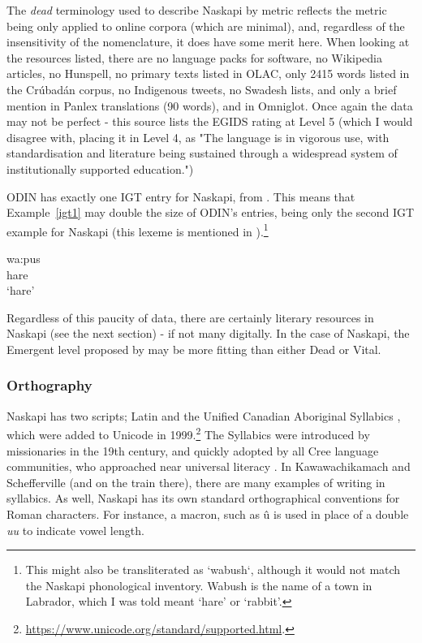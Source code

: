 The {\it dead} terminology used to describe Naskapi by  metric reflects the metric being only applied to online corpora (which are minimal), and, regardless of the insensitivity of the nomenclature, it does have some merit here. When looking at the resources listed, there are no language packs for software, no Wikipedia articles, no Hunspell, no primary texts listed in OLAC, only 2415 words listed in the Cr\'ubad\'an corpus, no Indigenous tweets, no Swadesh lists, and only a brief mention in Panlex translations (90 words), and in Omniglot. Once again the data may not be perfect - this source lists the EGIDS rating at Level 5 (which I would disagree with, placing it in Level 4, as "The language is in vigorous use, with standardisation and literature being sustained through a widespread system of institutionally supported education.")

ODIN has exactly one IGT entry for Naskapi, from \citet{richards2004syntax}. This means that Example~\ref{igt1} may double the size of ODIN's entries, being only the second IGT example for Naskapi (this lexeme is mentioned in \citet{macKenzie1980towards}).\footnote{This might also be transliterated as `wabush`, although it would not match the Naskapi phonological inventory. Wabush is the name of a town in Labrador, which I was told meant `hare' or `rabbit'.}

\begin{exe}
\ex
\gll wa:pus\\
hare\\
\trans `hare'
\label{igt1}
\end{exe}

Regardless of this paucity of data, there are certainly literary resources in Naskapi (see the next section) - if not many digitally. In the case of Naskapi, the Emergent level proposed by \citet{gibson2016assessing} may be more fitting than either Dead or Vital.

\subsubsection{Orthography}
Naskapi has two scripts; Latin and the Unified Canadian Aboriginal Syllabics \citep{wals-141}, which were added to Unicode in 1999.\footnote{\href{https://www.unicode.org/standard/supported.html}{https://www.unicode.org/standard/supported.html}. } The Syllabics were introduced by missionaries in the 19th century, and quickly adopted by all Cree language communities, who approached near universal literacy \citep{bennett1991cree}. In Kawawachikamach and Schefferville (and on the train there), there are many examples of writing in syllabics. As well, Naskapi has its own standard orthographical conventions for Roman characters. For instance, a macron, such as \^u is used in place of a double \emph{uu} to indicate vowel length.

